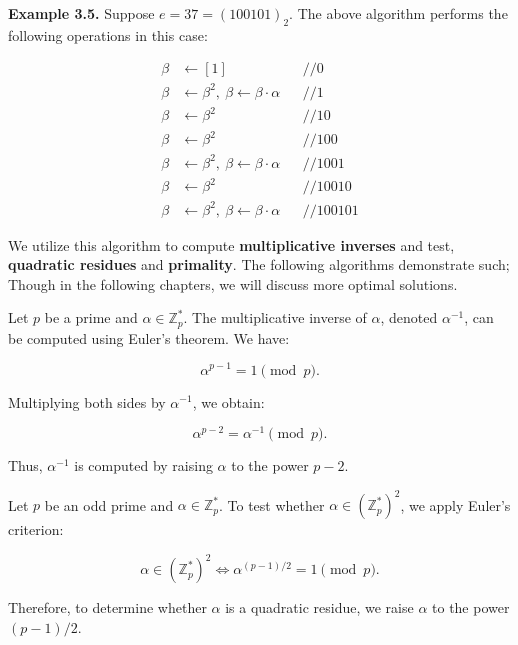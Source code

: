 \noindent
\textbf{Example 3.5.} Suppose $e = 37 = (100101)_2$. The above algorithm performs the following operations in this case:

\[
\begin{aligned}
    \beta &\gets [1] && // \text{0} \\
    \beta &\gets \beta^2, \ \beta \gets \beta \cdot \alpha && // \text{1} \\
    \beta &\gets \beta^2 && // \text{10} \\
    \beta &\gets \beta^2 && // \text{100} \\
    \beta &\gets \beta^2, \ \beta \gets \beta \cdot \alpha && // \text{1001} \\
    \beta &\gets \beta^2 && // \text{10010} \\
    \beta &\gets \beta^2, \ \beta \gets \beta \cdot \alpha && // \text{100101} 
\end{aligned}
\]

\vspace{1em}
\noindent 
We utilize this algorithm to compute \textbf{multiplicative inverses} and test, \textbf{quadratic residues} and \textbf{primality}. The following algorithms demonstrate 
such; Though in the following chapters, we will discuss more optimal solutions.

\newpage

\noindent

\begin{theo}

    Let \( p \) be a prime and \( \alpha \in \mathbb{Z}_p^* \). The multiplicative inverse of \( \alpha \), denoted \( \alpha^{-1} \), can be computed using Euler's theorem. We have:

    \[
    \alpha^{p-1} = 1 \pmod{p}.
    \]

    \noindent
    Multiplying both sides by \( \alpha^{-1} \), we obtain:

    \[
    \alpha^{p-2} = \alpha^{-1} \pmod{p}.
    \]
    
    \noindent
    Thus, \( \alpha^{-1} \) is computed by raising \( \alpha \) to the power \( p-2 \).
\end{theo}

\begin{theo}

    Let \( p \) be an odd prime and \( \alpha \in \mathbb{Z}_p^* \). To test whether \( \alpha \in (\mathbb{Z}_p^*)^2 \), we apply Euler's criterion:

    \[
    \alpha \in (\mathbb{Z}_p^*)^2 \iff \alpha^{(p-1)/2} = 1 \pmod{p}.
    \]
    
    \noindent
    Therefore, to determine whether \( \alpha \) is a quadratic residue, we raise \( \alpha \) to the power \( (p-1)/2 \).
\end{theo}



